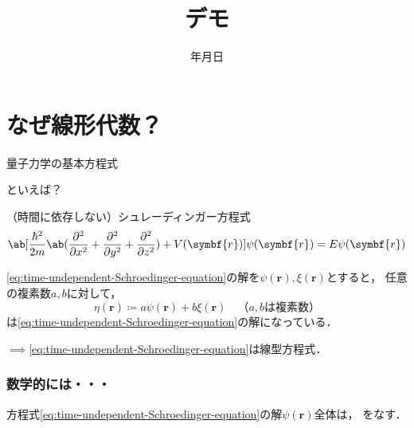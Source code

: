 \documentclass[
    10pt,
    ]{sotsu-beamer}
\begin{document}
\title{デモ}
\date{\number\year 年\number\month 月\number\day 日}


\begin{frame}

    \maketitle

\end{frame}


\section{なぜ線形代数？}


\begin{frame}{量子力学の基本方程式}

    といえば？

    \pause

    \begin{block}{（時間に依存しない）シュレーディンガー方程式}
        \begin{equation}
            \label{eq:time-undependent-Schroedinger-equation}
            \ab[ \frac{\hbar^2}{2m} \ab( \pdv[2]{}{x} + \pdv[2]{}{y} + \pdv[2]{}{z} ) + V(\symbf{r})] \psi(\symbf{r}) = E \psi(\symbf{r})
        \end{equation}
    \end{block}

    \pause
    
    \eqref{eq:time-undependent-Schroedinger-equation}の解を$\psi(\symbf{r}), \xi(\symbf{r})$とすると，
    任意の複素数$a, b$に対して，
    \[  \eta(\symbf{r}) \coloneq a \psi(\symbf{r}) + b \xi(\symbf{r}) 
        \quad \text{（$a, b$は複素数）}  \]
    は\eqref{eq:time-undependent-Schroedinger-equation}の解になっている．

    \pause

    $\implies$\alert{\eqref{eq:time-undependent-Schroedinger-equation}は線型方程式}．

\end{frame}



\begin{frame}
    \label{frame:psi-is-vector}
    \frametitle{数学的には・・・}

    \begin{center}
        方程式\eqref{eq:time-undependent-Schroedinger-equation}の解$\psi(\symbf{r})$全体は，
        をなす．
    \end{center}

\end{frame}
\end{document}
